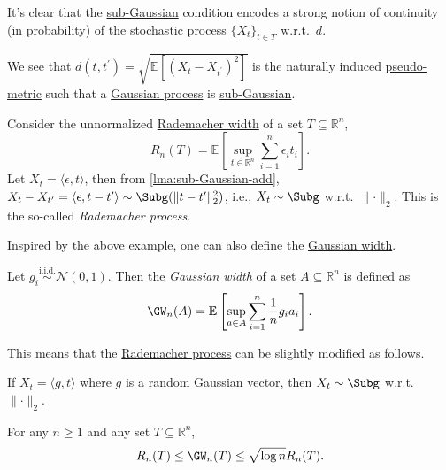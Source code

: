 It's clear that the \hyperref[def:sub-Gaussian-process]{sub-Gaussian} condition encodes a strong notion of continuity (in probability) of the stochastic process \(\{ X_t \} _{t\in T}\) w.r.t.\ \(d\).

\begin{eg}
	We see that \(d(t, t^{\prime} ) = \sqrt{\mathbb{E}_{}\left[ (X_t - X_{t^{\prime} })^2 \right]}\) is the naturally induced \hyperref[def:pseudo-metric]{pseudo-metric} such that a \hyperref[def:Gaussian-process]{Gaussian process} is \hyperref[def:sub-Gaussian-process]{sub-Gaussian}.
\end{eg}

\begin{eg}\label{eg:Rademacher-process}
	Consider the unnormalized \hyperref[def:Rademacher-width]{Rademacher width} of a set \(T \subseteq \mathbb{R} ^n\),
	\[
		R_n(T) = \mathbb{E}_{}\left[\sup _{t\in \mathbb{R} ^n} \sum_{i=1}^{n} \epsilon _i t_i \right] .
	\]
	Let \(X_t = \langle \epsilon , t \rangle \), then from \autoref{lma:sub-Gaussian-add}, \(X_t - X_{t^{\prime} } = \langle \epsilon , t-t^{\prime}  \rangle \sim \Subg(\lVert t - t^{\prime}  \rVert_2^2 )\), i.e., \(X_t \sim \Subg\) w.r.t.\ \(\lVert \cdot \rVert _2\). This is the so-called \emph{Rademacher process}.
\end{eg}

Inspired by the above example, one can also define the \hyperref[def:Gaussian-width]{Gaussian width}.

\begin{definition}\label{def:Gaussian-width}
	Let \(g_i \overset{\text{i.i.d.} }{\sim } \mathcal{N} (0, 1)\). Then the \emph{Gaussian width} of a set \(A \subseteq \mathbb{R} ^n\) is defined as
	\[
		\GW_n(A) = \mathbb{E}_{}\left[\sup _{a\in A} \sum_{i=1}^{n} \frac{1}{n} g_i a_i \right].
	\]
\end{definition}

This means that the \hyperref[eg:Rademacher-process]{Rademacher process} can be slightly modified as follows.

\begin{eg}
	If \(X_t = \langle g, t \rangle \) where \(g\) is a random Gaussian vector, then \(X_t \sim \Subg\) w.r.t.\ \(\lVert \cdot \rVert _2\).
\end{eg}

\begin{theorem}
	For any \(n \geq 1\) and any set \(T \subseteq \mathbb{R} ^n\),
	\[
		R_n(T) \leq \GW_n(T) \leq \sqrt{\log n} R_n(T).
	\]
\end{theorem}

